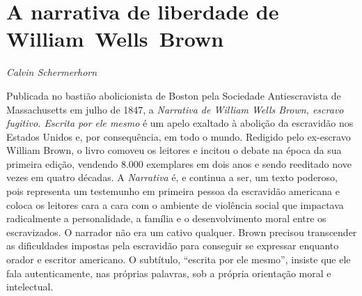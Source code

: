 \chapter*{A narrativa de liberdade de William~Wells~Brown}

\begin{flushright}
\emph{Calvin Schermerhorn}
\end{flushright}

Publicada no bastião abolicionista de Boston
pela Sociedade Antiescravista de Massachusetts em julho de 1847, a
\emph{Narrativa de William Wells Brown, escravo fugitivo. Escrita
por ele mesmo} é um apelo exaltado à abolição da escravidão nos Estados
Unidos e, por consequência, em todo o mundo. Redigido pelo ex-escravo
William Brown, o livro comoveu os leitores e incitou o debate na época
da sua primeira edição, vendendo 8.000 exemplares em dois anos e sendo
reeditado nove vezes em quatro décadas. A \emph{Narrativa} é, e continua
a ser, um texto poderoso, pois representa um testemunho em primeira
pessoa da escravidão americana e coloca os leitores cara a cara com o
ambiente de violência social que impactava radicalmente a personalidade,
a família e o desenvolvimento moral entre os escravizados. O narrador
não era um cativo qualquer. Brown precisou transcender as dificuldades
impostas pela escravidão para conseguir se expressar enquanto orador e
escritor americano. O subtítulo, ``escrita por ele mesmo'', insiste que
ele fala autenticamente, nas próprias palavras, sob a própria orientação
moral e intelectual.


